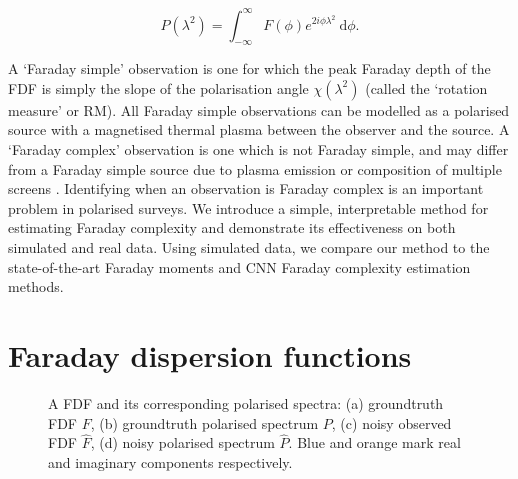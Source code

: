   \begin{equation}
      \label{eq:f-to-p}
      P(\lambda^2) = \int_{-\infty}^{\infty} F(\phi) e^{2i\phi\lambda^2}\ \mathrm{d}\phi.
  \end{equation}

  A `Faraday simple' observation is one for which the peak Faraday depth of the FDF is simply the slope of the polarisation angle $\chi(\lambda^2)$ (called the `rotation measure' or RM). All Faraday simple observations can be modelled as a polarised source with a magnetised thermal plasma \citep[a `Faraday screen';][]{brentjens_faraday_2005,anderson_broadband_2015} between the observer and the source. A `Faraday complex' observation is one which is not Faraday simple, and may differ from a Faraday simple source due to plasma emission or composition of multiple screens \citep{brentjens_faraday_2005}. Identifying when an observation is Faraday complex is an important problem in polarised surveys. We introduce a simple, interpretable method for estimating Faraday complexity and demonstrate its effectiveness on both simulated and real data. Using simulated data, we compare our method to the state-of-the-art Faraday moments and CNN Faraday complexity estimation methods.

\section{Faraday dispersion functions}

  \begin{figure}
    \caption{A FDF and its corresponding polarised spectra: (a) groundtruth FDF $F$, (b) groundtruth polarised spectrum $P$, (c) noisy observed FDF $\hat F$, (d) noisy polarised spectrum $\hat P$. Blue and orange mark real and imaginary components respectively.}
  \end{figure}

